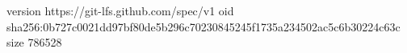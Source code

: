 version https://git-lfs.github.com/spec/v1
oid sha256:0b727c0021dd97bf80de5b296c70230845245f1735a234502ac5c6b30224c63c
size 786528
